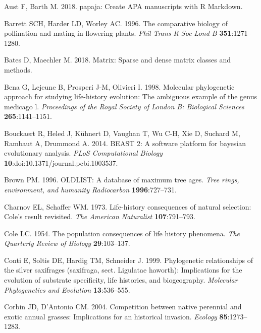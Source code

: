 \documentclass[man,floatsintext]{apa6}
\theoremstyle{definition}
\theoremstyle{definition}
\theoremstyle{definition}
\theoremstyle{remark}
\begin{document}
\leavevmode\hypertarget{ref-R-papaja}{}%
Aust F, Barth M. 2018. papaja: Create APA manuscripts with R Markdown.

\leavevmode\hypertarget{ref-barrett1996comparative}{}%
Barrett SCH, Harder LD, Worley AC. 1996. The comparative biology of
pollination and mating in flowering plants. \emph{Phil Trans R Soc Lond
B} \textbf{351}:1271--1280.

\leavevmode\hypertarget{ref-R-Matrix}{}%
Bates D, Maechler M. 2018. Matrix: Sparse and dense matrix classes and
methods.

\leavevmode\hypertarget{ref-bena1998molecular}{}%
Bena G, Lejeune B, Prosperi J-M, Olivieri I. 1998. Molecular
phylogenetic approach for studying life-history evolution: The ambiguous
example of the genus medicago l. \emph{Proceedings of the Royal Society
of London B: Biological Sciences} \textbf{265}:1141--1151.

\leavevmode\hypertarget{ref-bouckaert2014beast}{}%
Bouckaert R, Heled J, Kühnert D, Vaughan T, Wu C-H, Xie D, Suchard M,
Rambaut A, Drummond A. 2014. BEAST 2: A software platform for bayesian
evolutionary analysis. \emph{PLoS Computational Biology}
\textbf{10}:doi:10.1371/journal.pcbi.1003537.

\leavevmode\hypertarget{ref-brown1996oldlist}{}%
Brown PM. 1996. OLDLIST: A database of maximum tree ages. \emph{Tree
rings, environment, and humanity Radiocarbon} \textbf{1996}:727--731.

\leavevmode\hypertarget{ref-charnov1973life}{}%
Charnov EL, Schaffer WM. 1973. Life-history consequences of natural
selection: Cole's result revisited. \emph{The American Naturalist}
\textbf{107}:791--793.

\leavevmode\hypertarget{ref-cole1954population}{}%
Cole LC. 1954. The population consequences of life history phenomena.
\emph{The Quarterly Review of Biology} \textbf{29}:103--137.

\leavevmode\hypertarget{ref-conti1999phylogenetic}{}%
Conti E, Soltis DE, Hardig TM, Schneider J. 1999. Phylogenetic
relationships of the silver saxifrages (saxifraga, sect. Ligulatae
haworth): Implications for the evolution of substrate specificity, life
histories, and biogeography. \emph{Molecular Phylogenetics and
Evolution} \textbf{13}:536--555.

\leavevmode\hypertarget{ref-corbin2004competition}{}%
Corbin JD, D'Antonio CM. 2004. Competition between native perennial and
exotic annual grasses: Implications for an historical invasion.
\emph{Ecology} \textbf{85}:1273--1283.
\end{document}
